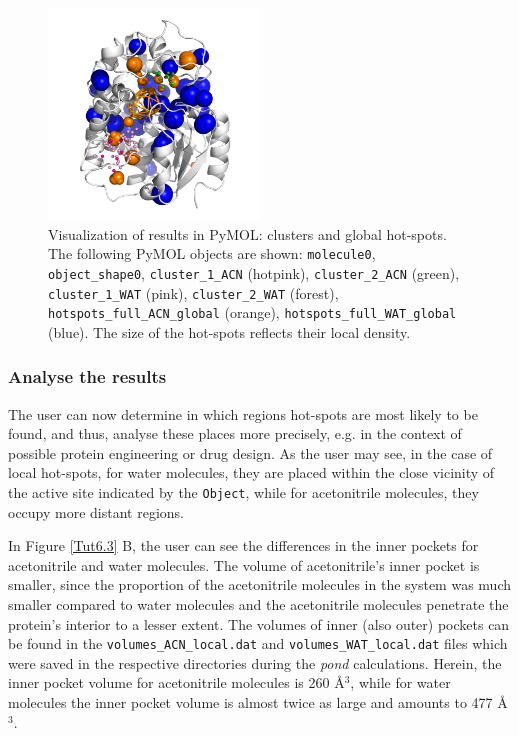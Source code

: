 \documentclass[9pt,tutorial, pubversion]{livecoms}
\begin{document}
\begin{figure}[ht!]
\centering
\includegraphics[width=0.5\textwidth]{Tut6.4.png}
\caption{Visualization of results in PyMOL: clusters and global hot-spots. The following PyMOL objects are shown: \texttt{molecule0}, \texttt{object\_shape0}, \texttt{cluster\_1\_ACN} (hotpink), \texttt{cluster\_2\_ACN} (green), \texttt{cluster\_1\_WAT} (pink), \texttt{cluster\_2\_WAT} (forest), \texttt{hotspots\_full\_ACN\_global} (orange), \texttt{hotspots\_full\_WAT\_global} (blue). The size of the hot-spots reflects their local density.}
\label{Tut6.4}
\end{figure}

\subsubsection{Analyse the results}
The user can now determine in which regions hot-spots are most likely to be found, and thus, analyse these places more precisely, e.g. in the context of possible protein engineering or drug design. As the user may see, in the case of local hot-spots, for water molecules, they are placed within the close vicinity of the active site indicated by the \texttt{Object}, while for acetonitrile molecules, they occupy more distant regions.

In Figure \ref{Tut6.3} B, the user can see the differences in the inner pockets for acetonitrile and water molecules. The volume of acetonitrile's inner pocket is smaller, since the proportion of the acetonitrile molecules in the system was much smaller compared to water molecules and the acetonitrile molecules penetrate the protein's interior to a lesser extent. The volumes of inner (also outer) pockets can be found in the \texttt{volumes\_ACN\_local.dat} and \texttt{volumes\_WAT\_local.dat} files which were saved in the respective directories during the \emph{pond} calculations. Herein, the inner pocket volume for acetonitrile molecules is 260 Å\( \displaystyle ^{3}\), while for water molecules the inner pocket volume is almost twice as large and amounts to 477 Å\( \displaystyle ^{3}\).
\end{document}
